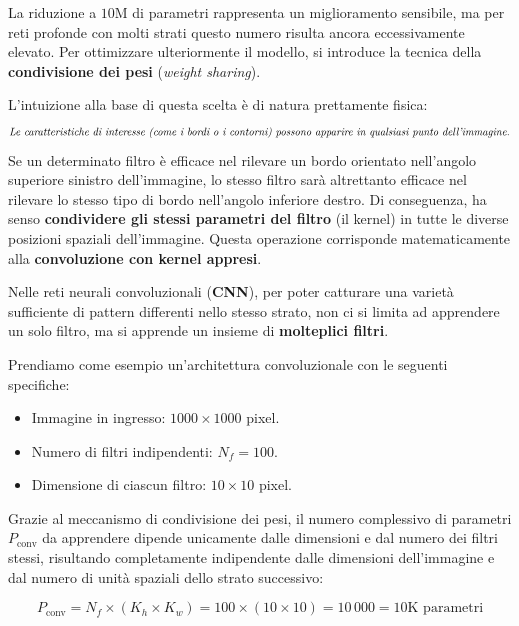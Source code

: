 ﻿\documentclass[11pt, a4paper]{article}
\begin{document}
La riduzione a $10\text{M}$ di parametri rappresenta un miglioramento sensibile, ma per reti profonde con molti strati questo numero risulta ancora eccessivamente elevato. Per ottimizzare ulteriormente il modello, si introduce la tecnica della \textbf{condivisione dei pesi} (\emph{weight sharing}).

L'intuizione alla base di questa scelta è di natura prettamente fisica:
\[
\text{\emph{Le caratteristiche di interesse (come i bordi o i contorni) possono apparire in qualsiasi punto dell'immagine.}}
\]
Se un determinato filtro è efficace nel rilevare un bordo orientato nell'angolo superiore sinistro dell'immagine, lo stesso filtro sarà altrettanto efficace nel rilevare lo stesso tipo di bordo nell'angolo inferiore destro. Di conseguenza, ha senso \textbf{condividere gli stessi parametri del filtro} (il kernel) in tutte le diverse posizioni spaziali dell'immagine. Questa operazione corrisponde matematicamente alla \textbf{convoluzione con kernel appresi}.


Nelle reti neurali convoluzionali (\textbf{CNN}), per poter catturare una varietà sufficiente di pattern differenti nello stesso strato, non ci si limita ad apprendere un solo filtro, ma si apprende un insieme di \textbf{molteplici filtri}.

Prendiamo come esempio un'architettura convoluzionale con le seguenti specifiche:
\begin{itemize}
    \item Immagine in ingresso: $1000 \times 1000$ pixel.
    \item Numero di filtri indipendenti: $N_f = 100$.
    \item Dimensione di ciascun filtro: $10 \times 10$ pixel.
\end{itemize}

Grazie al meccanismo di condivisione dei pesi, il numero complessivo di parametri $P_{\text{conv}}$ da apprendere dipende unicamente dalle dimensioni e dal numero dei filtri stessi, risultando completamente indipendente dalle dimensioni dell'immagine e dal numero di unità spaziali dello strato successivo:

\[
\boxed{P_{\text{conv}} = N_f \times (K_h \times K_w) = 100 \times (10 \times 10) = 10\,000 = 10\text{K} \text{ parametri}}
\]
\end{document}
